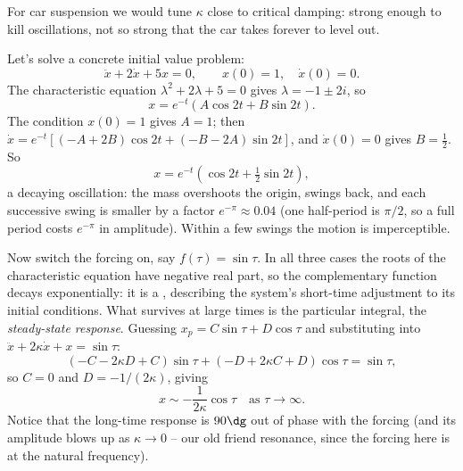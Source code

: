 \documentclass[a4paper]{scrartcl}
\begin{document}
\begin{center}
\end{center}
For car suspension we would tune $\kappa$ close to critical damping: strong enough to kill oscillations, not so strong that the car takes forever to level out.

\begin{example}
	Let's solve a concrete initial value problem:
	$$
	\ddot x + 2\dot x + 5x = 0, \qquad x(0) = 1, \quad \dot x(0) = 0.
	$$
	The characteristic equation $\lambda^2 + 2\lambda + 5 = 0$ gives $\lambda = -1 \pm 2i$, so
	$$
	x = e^{-t}(A\cos 2t + B \sin 2t).
	$$
	The condition $x(0) = 1$ gives $A = 1$; then $\dot x = e^{-t}\left[(-A + 2B)\cos 2t + (-B - 2A)\sin 2t\right]$, and $\dot x(0) = 0$ gives $B = \frac12$. So
	$$
	x = e^{-t}\left(\cos 2t + \tfrac12 \sin 2t\right),
	$$
	a decaying oscillation: the mass overshoots the origin, swings back, and each successive swing is smaller by a factor $e^{-\pi} \approx 0.04$ (one half-period is $\pi/2$, so a full period costs $e^{-\pi}$ in amplitude). Within a few swings the motion is imperceptible.
\end{example}

Now switch the forcing on, say $f(\tau) = \sin \tau$. In all three cases the roots of the characteristic equation have negative real part, so the complementary function decays exponentially: it is a , describing the system's short-time adjustment to its initial conditions. What survives at large times is the particular integral, the \emph{steady-state response}. Guessing $x_p = C \sin \tau + D \cos \tau$ and substituting into $\ddot x + 2\kappa \dot x + x = \sin \tau$:
$$
(-C - 2\kappa D + C) \sin \tau + (-D + 2\kappa C + D) \cos \tau = \sin \tau,
$$
so $C = 0$ and $D = -1/(2\kappa)$, giving
$$
x \sim -\frac{1}{2\kappa} \cos \tau \quad \text{as } \tau \to \infty.
$$
Notice that the long-time response is $90\dg$ out of phase with the forcing (and its amplitude blows up as $\kappa \to 0$ -- our old friend resonance, since the forcing here is at the natural frequency).
\end{document}
